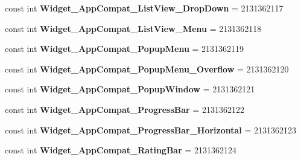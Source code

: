 \begin{DoxyCompactItemize}
const int {\bfseries Widget\+\_\+\+App\+Compat\+\_\+\+List\+View\+\_\+\+Drop\+Down} = 2131362117
\item 
\mbox{\label{class_sample_app_1_1_droid_1_1_resource_1_1_style_addf55f4bf7ab2cf3e6890b938927e424}} 
const int {\bfseries Widget\+\_\+\+App\+Compat\+\_\+\+List\+View\+\_\+\+Menu} = 2131362118
\item 
\mbox{\label{class_sample_app_1_1_droid_1_1_resource_1_1_style_a52f9fd2e4d641975200c9ccd18f1d4ef}} 
const int {\bfseries Widget\+\_\+\+App\+Compat\+\_\+\+Popup\+Menu} = 2131362119
\item 
\mbox{\label{class_sample_app_1_1_droid_1_1_resource_1_1_style_a3297c8cec2299e1933800d161e8beadc}} 
const int {\bfseries Widget\+\_\+\+App\+Compat\+\_\+\+Popup\+Menu\+\_\+\+Overflow} = 2131362120
\item 
\mbox{\label{class_sample_app_1_1_droid_1_1_resource_1_1_style_a3858ef5e3b4b37433babb40c283852b2}} 
const int {\bfseries Widget\+\_\+\+App\+Compat\+\_\+\+Popup\+Window} = 2131362121
\item 
\mbox{\label{class_sample_app_1_1_droid_1_1_resource_1_1_style_a9d483fee1a377da0c2a554f19159c19f}} 
const int {\bfseries Widget\+\_\+\+App\+Compat\+\_\+\+Progress\+Bar} = 2131362122
\item 
\mbox{\label{class_sample_app_1_1_droid_1_1_resource_1_1_style_ab380e97e2f04245dbe9d20e6d343042c}} 
const int {\bfseries Widget\+\_\+\+App\+Compat\+\_\+\+Progress\+Bar\+\_\+\+Horizontal} = 2131362123
\item 
\mbox{\label{class_sample_app_1_1_droid_1_1_resource_1_1_style_afa8da7e312e7333c4785134df28cad58}} 
const int {\bfseries Widget\+\_\+\+App\+Compat\+\_\+\+Rating\+Bar} = 2131362124
\item 
\mbox{\label{class_sample_app_1_1_droid_1_1_resource_1_1_style_abca13845a6ff3b9748986d915dc5f756}} 

\end{DoxyCompactItemize}

